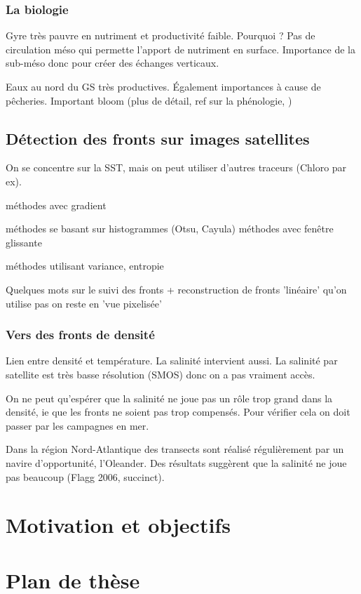 \subsubsection{La biologie}
\label{sec:gs-biologie}

Gyre très pauvre en nutriment et productivité faible.
Pourquoi ?
Pas de circulation méso qui permette l'apport de nutriment en surface.
Importance de la sub-méso donc pour créer des échanges verticaux.

Eaux au nord du GS très productives.
Également importances à cause de pêcheries.
Important bloom (plus de détail, ref sur la phénologie, )


\subsection{Détection des fronts sur images satellites}
\label{sec:detection-fronts}

On se concentre sur la SST, mais on peut utiliser d'autres traceurs (Chloro par ex).

méthodes avec gradient

méthodes se basant sur histogrammes (Otsu, Cayula)
méthodes avec fenêtre glissante

méthodes utilisant variance, entropie

Quelques mots sur le suivi des fronts + reconstruction de fronts 'linéaire'
qu'on utilise pas on reste en 'vue pixelisée'

\subsubsection{Vers des fronts de densité}


Lien entre densité et température.
La salinité intervient aussi. La salinité par satellite est très basse résolution (SMOS) donc on a pas vraiment accès.

On ne peut qu'espérer que la salinité ne joue pas un rôle trop grand dans la densité, ie que les fronts ne soient pas trop compensés.
Pour vérifier cela on doit passer par les campagnes en mer.

Dans la région Nord-Atlantique des transects sont réalisé régulièrement par un navire d'opportunité, l'Oleander.
Des résultats suggèrent que la salinité ne joue pas beaucoup (Flagg 2006, succinct).

\section{Motivation et objectifs}
\label{sec:problematique}

\section{Plan de thèse}
\label{sec:plan-de-these}
